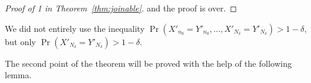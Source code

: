 \documentclass[12pt,a4paper]{article}
\begin{document}
\begin{proof}[Proof of 1 in Theorem~\ref{thm:joinable}]
%
%
%
%
%
%
%
%
%
%
%
and the proof is over.
\end{proof}

\begin{remark}
We did not entirely use the inequality 
$\Pr(X'_{n_0}=Y'_{n_0}, \ldots, X'_{N_\delta}=Y'_{N_\delta}) > 1-\delta$, but 
only $\Pr(X'_{N_\delta}=Y'_{N_\delta}) > 1-\delta$.
\end{remark}

The second point of the theorem will be proved with the help of the following lemma. 
\end{document}
